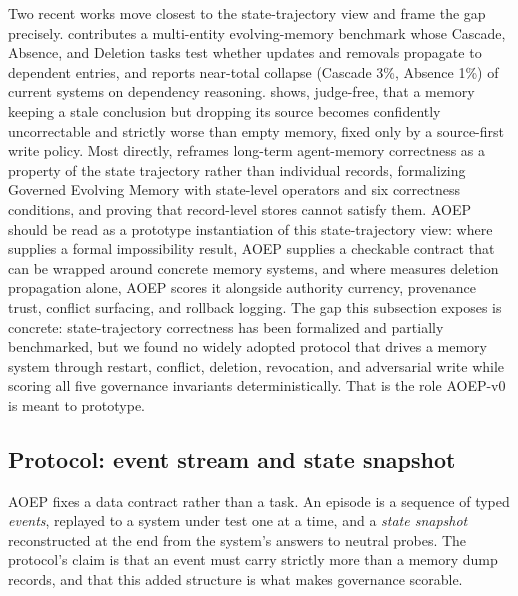Two recent works move closest to the state-trajectory view and frame the gap precisely. \citet{jung2026meme} contributes a multi-entity evolving-memory benchmark whose Cascade, Absence, and Deletion tasks test whether updates and removals propagate to dependent entries, and reports near-total collapse (Cascade 3\%, Absence 1\%) of current systems on dependency reasoning. \citet{kwon2026reclaim} shows, judge-free, that a memory keeping a stale conclusion but dropping its source becomes confidently uncorrectable and strictly worse than empty memory, fixed only by a source-first write policy. Most directly, \citet{orogat2026gem} reframes long-term agent-memory correctness as a property of the state trajectory rather than individual records, formalizing Governed Evolving Memory with state-level operators and six correctness conditions, and proving that record-level stores cannot satisfy them. AOEP should be read as a prototype instantiation of this state-trajectory view: where \citet{orogat2026gem} supplies a formal impossibility result, AOEP supplies a checkable contract that can be wrapped around concrete memory systems, and where \citet{jung2026meme} measures deletion propagation alone, AOEP scores it alongside authority currency, provenance trust, conflict surfacing, and rollback logging. The gap this subsection exposes is concrete: state-trajectory correctness has been formalized and partially benchmarked, but we found no widely adopted protocol that drives a memory system through restart, conflict, deletion, revocation, and adversarial write while scoring all five governance invariants deterministically. That is the role AOEP-v0 is meant to prototype.

\subsection{Protocol: event stream and state snapshot}

AOEP fixes a data contract rather than a task. An episode is a sequence of typed \emph{events}, replayed to a system under test one at a time, and a \emph{state snapshot} reconstructed at the end from the system's answers to neutral probes. The protocol's claim is that an event must carry strictly more than a memory dump records, and that this added structure is what makes governance scorable.

